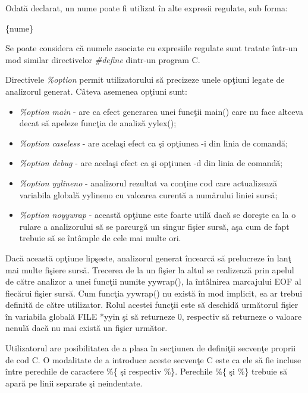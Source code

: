 Odat\u{a} declarat, un nume poate fi utilizat \^{i}n alte expresii regulate, sub forma:
\begin{center}
\{nume\}
\end{center}

Se poate considera c\u{a} numele asociate cu expresiile regulate sunt tratate \^{i}ntr-un mod similar directivelor \emph{\#define} dintr-un program C.

Directivele \emph{\%option} permit utilizatorului s\u{a} precizeze unele op\c{t}iuni legate de analizorul generat. C\^{a}teva asemenea op\c{t}iuni sunt:

\begin{itemize}
	\item \emph{\%option main} - are ca efect generarea unei func\c{t}ii main() care nu face altceva decat s\u{a} apeleze func\c{t}ia de analiz\u{a} yylex();
	\item \emph{\%option caseless} - are acela\c{s}i efect ca \c{s}i op\c{t}iunea -i din linia de comand\u{a};
	\item \emph{\%option debug} - are acela\c{s}i efect ca \c{s}i op\c{t}iunea -d din linia de comand\u{a}; 
	\item \emph{\%option yylineno} - analizorul rezultat va con\c{t}ine cod care actualizeaz\u{a} variabila global\u{a} yylineno cu valoarea curent\u{a} a num\u{a}rului liniei surs\u{a}; 
	\item \emph{\%option noyywrap} - aceast\u{a} op\c{t}iune este foarte util\u{a} dac\u{a} se dore\c{s}te ca la o rulare a analizorului s\u{a} se parcurg\u{a} un singur fi\c{s}ier surs\u{a}, a\c{s}a cum de fapt trebuie s\u{a} se \^{i}nt\^{a}mple de cele mai multe ori. 
\end{itemize}

Dac\u{a} aceast\u{a} op\c{t}iune lip\c{s}este, analizorul generat \^{i}ncearc\u{a} s\u{a} prelucreze \^{i}n lan\c{t} mai multe fi\c{s}iere surs\u{a}. Trecerea de la un fi\c{s}ier la altul se realizeaz\u{a} prin apelul de c\u{a}tre analizor a unei func\c{t}ii numite yywrap(), la \^{i}nt\^{a}lnirea marcajului EOF al fiec\u{a}rui fi\c{s}ier surs\u{a}. Cum func\c{t}ia yywrap() nu exist\u{a} \^{i}n mod implicit, ea ar trebui definit\u{a} de c\u{a}tre utilizator. Rolul acestei func\c{t}ii este s\u{a} deschid\u{a} urm\u{a}torul fi\c{s}ier \^{i}n variabila global\u{a} FILE *yyin \c{s}i s\u{a} returneze 0, respectiv s\u{a} returneze o valoare nenul\u{a} dac\u{a} nu mai exist\u{a} un fi\c{s}ier urm\u{a}tor.

Utilizatorul are posibilitatea de a plasa \^{i}n sec\c{t}iunea de defini\c{t}ii secven\c{t}e proprii de cod C. O modalitate de a introduce aceste secven\c{t}e C este ca ele s\u{a} fie incluse \^{i}ntre perechile de caractere \%\{ \c{s}i respectiv \%\}. Perechile \%\{ \c{s}i \%\} trebuie s\u{a} apar\u{a} pe linii separate \c{s}i neindentate. 


